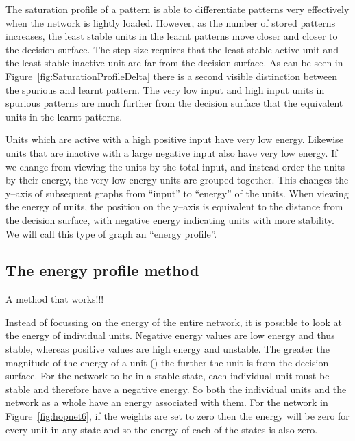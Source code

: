 The saturation profile of a pattern is able to differentiate patterns very effectively when the network is lightly loaded.  However, as the number of stored patterns increases, the least stable units in the learnt patterns move closer and closer to the decision surface.  The step size requires that the least stable active unit and the least stable inactive unit are far from the decision surface.  As can be seen in Figure~\ref{fig:SaturationProfileDelta} there is a second visible distinction between the spurious and learnt pattern.  The very low input and high input units in spurious patterns are much further from the decision surface that the equivalent units in the learnt patterns. 

Units which are active with a high positive input have very low energy.  Likewise units that are inactive with a large negative input also have very low energy.  If we change from viewing the units by the total input, and instead order the units by their energy, the very low energy units are grouped together.  This changes the y--axis of subsequent  graphs from ``input'' to ``energy'' of the units.  When viewing the energy of units, the position on the y--axis is equivalent to the distance from the decision surface, with negative energy indicating units with more stability.  We will call this type of graph an ``energy profile''.


\subsection{The energy profile method}  %

A method that works!!!

Instead of focussing on the energy of the entire network, it is possible to look at the energy of individual units. Negative energy values are low energy and thus stable, whereas positive values are high energy and unstable.  The greater the magnitude of the energy of a unit (\unitEnergy{}{}) the further the unit is from the decision surface.  For the network to be in a stable state, each individual unit must be stable and therefore have a negative energy.  So both the individual units and the network as a whole have an energy associated with them.  For the network in Figure~\ref{fig:hopnet6}, if the weights are set to zero then the energy will be zero for every unit in any state and so the energy of each of the states is also zero.  

